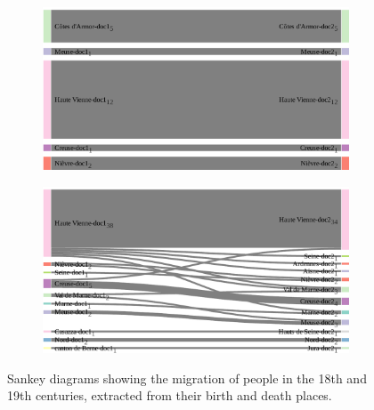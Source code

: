 \begin{figure}[h]
    \centering

    \begin{subfigure}{0.49\linewidth}
    \includegraphics[width=\textwidth]{static/figures/ComBiNet/OriginalPaperFigures/CGF/frenchGenealogy/migration_18.pdf}
    \end{subfigure}
    \begin{subfigure}{0.49\linewidth}
    \includegraphics[width=\textwidth]{static/figures/ComBiNet/OriginalPaperFigures/CGF/frenchGenealogy/migration_19.pdf}
    \end{subfigure}

    \caption{Sankey diagrams showing the migration of people in the 18th and 19th centuries, extracted from their birth and death places.}\label{fig:useCaseNicole2}
\end{figure}


